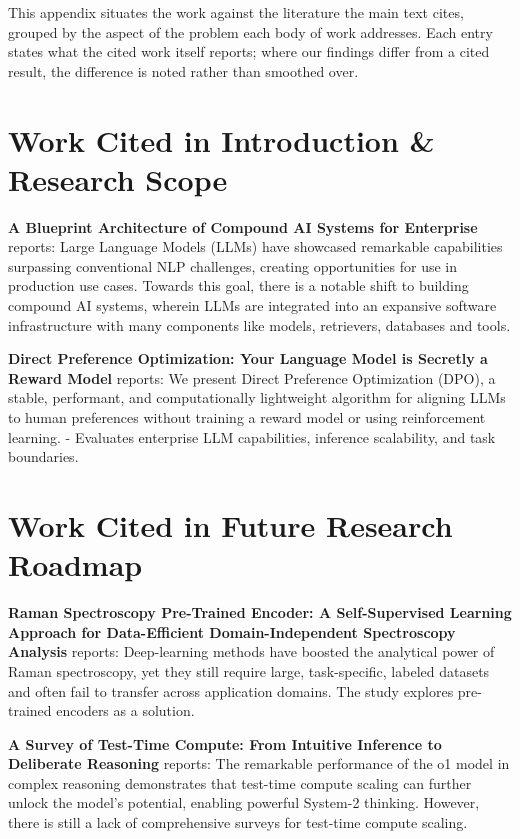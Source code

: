 \documentclass{article}
\begin{document}
This appendix situates the work against the literature the main text cites, grouped by the aspect of the problem each body of work addresses. Each entry states what the cited work itself reports; where our findings differ from a cited result, the difference is noted rather than smoothed over.


\section{Work Cited in Introduction \& Research Scope}


\textbf{A Blueprint Architecture of Compound AI Systems for Enterprise} \cite{arxiv_2406_00584} reports: Large Language Models (LLMs) have showcased remarkable capabilities surpassing conventional NLP challenges, creating opportunities for use in production use cases. Towards this goal, there is a notable shift to building compound AI systems, wherein LLMs are integrated into an expansive software infrastructure with many components like models, retrievers, databases and tools.

\textbf{Direct Preference Optimization: Your Language Model is Secretly a Reward Model} \cite{arxiv_2305_18290} reports: We present Direct Preference Optimization (DPO), a stable, performant, and computationally lightweight algorithm for aligning LLMs to human preferences without training a reward model or using reinforcement learning. - Evaluates enterprise LLM capabilities, inference scalability, and task boundaries.


\section{Work Cited in Future Research Roadmap}


\textbf{Raman Spectroscopy Pre-Trained Encoder: A Self-Supervised Learning Approach for Data-Efficient Domain-Independent Spectroscopy Analysis} \cite{doaj_001772c2113c476d9d5d40452c8e10e1} reports: Deep-learning methods have boosted the analytical power of Raman spectroscopy, yet they still require large, task-specific, labeled datasets and often fail to transfer across application domains. The study explores pre-trained encoders as a solution.

\textbf{A Survey of Test-Time Compute: From Intuitive Inference to Deliberate Reasoning} \cite{arxiv_2501_02497} reports: The remarkable performance of the o1 model in complex reasoning demonstrates that test-time compute scaling can further unlock the model's potential, enabling powerful System-2 thinking. However, there is still a lack of comprehensive surveys for test-time compute scaling.
\end{document}
